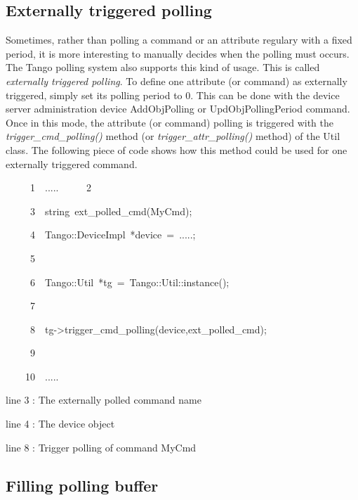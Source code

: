 \subsection{Externally triggered polling}

Sometimes, rather than polling a command or an attribute regulary
with a fixed period, it is more interesting to \textquotedbl{}manually\textquotedbl{}
decides when the polling must occurs. The Tango polling system also
supports this kind of usage. This is called \emph{externally triggered
polling}. To define one attribute (or command) as externally triggered,
simply set its polling period to 0. This can be done with the device
server administration device AddObjPolling or UpdObjPollingPeriod
command. Once in this mode, the attribute (or command) polling is
triggered with the \emph{trigger\_cmd\_polling()} method (or \emph{trigger\_attr\_polling()}
method) of the Util class. The following piece of code shows how this
method could be used for one externally triggered command.



\begin{lyxcode}
~~~~~1~~.....
~~~~~2~~

~~~~~3~~string~ext\_polled\_cmd(\textquotedbl{}MyCmd\textquotedbl{});

~~~~~4~~Tango::DeviceImpl~{*}device~=~.....;

~~~~~5~~

~~~~~6~~Tango::Util~{*}tg~=~Tango::Util::instance();

~~~~~7~~

~~~~~8~~tg->trigger\_cmd\_polling(device,ext\_polled\_cmd);

~~~~~9~~

~~~~10~~.....

\end{lyxcode}


line 3 : The externally polled command name

line 4 : The device object

line 8 : Trigger polling of command MyCmd

\subsection{Filling polling buffer}

